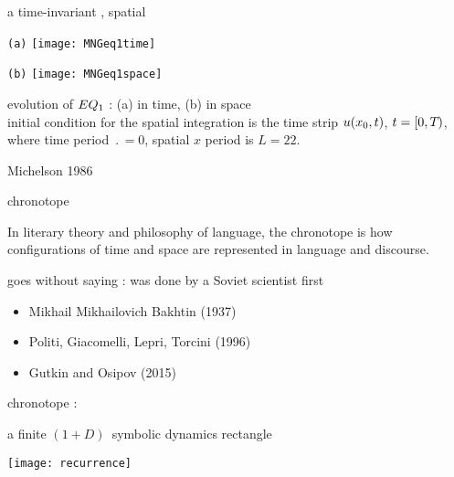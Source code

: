 \begin{frame}{a time-invariant \eqv, spatial \po}
\begin{center}
  \begin{minipage}[height=.45\textheight]{.45\textwidth}
    \centering \small{\texttt{(a)}}
    \texttt{[image: MNGeq1time]}
  \end{minipage}
  \begin{minipage}[height=.45\textheight]{.45\textwidth}
    \centering \small{\texttt{(b)}}
    \texttt{[image: MNGeq1space]}
  \end{minipage}
\end{center}
  evolution of $EQ_{1}$ : (a) in time, (b) in space
   \\
   initial condition for the spatial integration is the time strip
   $u(x_0,t)$, $t = [0,{T_{}})$, where time period
   $\period{} =0$, spatial $x$ period is $L=22$.

\vfill\hfill        Michelson 1986
\end{frame}


\begin{frame}{chronotope}
\begin{bartlett}{
In literary theory and philosophy of language, the chronotope is how
configurations of time and space are represented in language and
discourse.
                }
\end{bartlett}

\bigskip
\bigskip
goes without saying : was done by a Soviet scientist first

\begin{itemize}
  \item Mikhail Mikhailovich Bakhtin (1937)
  \item Politi, Giacomelli, Lepri, Torcini (1996)
  \item Gutkin and Osipov (2015)
\end{itemize}
\end{frame}

\begin{frame}{chronotope : }

a finite $(1+D)$\dmn\ symbolic dynamics rectangle

\begin{center}
\texttt{[image: recurrence]}
\end{center}
\hfill \color{red}{make it doubly periodic}
\end{frame}

